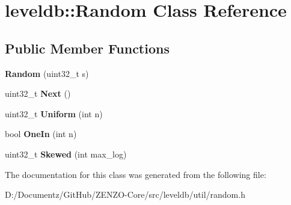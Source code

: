 \hypertarget{classleveldb_1_1_random}{}\section{leveldb\+::Random Class Reference}
\label{classleveldb_1_1_random}
\subsection*{Public Member Functions}
\begin{DoxyCompactItemize}
\item 
\mbox{\label{classleveldb_1_1_random_a1c0c29265d466774943d8e3769abc411}} 
{\bfseries Random} (uint32\+\_\+t s)
\item 
\mbox{\label{classleveldb_1_1_random_a9e00ef1fcc82ed0ad16ba91b30ae8038}} 
uint32\+\_\+t {\bfseries Next} ()
\item 
\mbox{\label{classleveldb_1_1_random_a9281323c3f115fa47a0f329f72ad2a80}} 
uint32\+\_\+t {\bfseries Uniform} (int n)
\item 
\mbox{\label{classleveldb_1_1_random_abed35e25c0e08c2c4cb6d06b62cd1b73}} 
bool {\bfseries One\+In} (int n)
\item 
\mbox{\label{classleveldb_1_1_random_a41987dcc7818d7bc0e68e2418c51d94e}} 
uint32\+\_\+t {\bfseries Skewed} (int max\+\_\+log)
\end{DoxyCompactItemize}


The documentation for this class was generated from the following file\+:\begin{DoxyCompactItemize}
\item 
D\+:/\+Documentz/\+Git\+Hub/\+Z\+E\+N\+Z\+O-\/\+Core/src/leveldb/util/random.\+h\end{DoxyCompactItemize}
